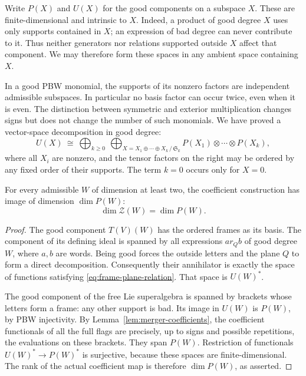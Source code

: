 Write $P(X)$ and $U(X)$ for the good components on a subspace $X$.
These are finite-dimensional and intrinsic to $X$.  Indeed, a product
of good degree $X$ uses only supports contained in $X$; an expression
of bad degree can never contribute to it.  Thus neither generators nor
relations supported outside $X$ affect that component.  We may
therefore form these spaces in any ambient space containing $X$.

In a good PBW monomial, the supports of its nonzero factors are
independent admissible subspaces.  In particular no basis factor can
occur twice, even when it is even.  The distinction between symmetric
and exterior multiplication changes signs but does not change the
number of such monomials.  We have proved a vector-space decomposition
in good degree:
\begin{equation}\label{eq:frame-pbw-decomposition}
 U(X)\ \cong\
 \bigoplus_{k\geq0}\ 
 \bigoplus_{X=X_1\oplus\cdots\oplus X_k\,/\,\mathfrak S_k}
 P(X_1)\otimes\cdots\otimes P(X_k),
\end{equation}
where all $X_i$ are nonzero, and the tensor factors on the right may
be ordered by any fixed order of their supports.  The term $k=0$
occurs only for $X=0$.

\begin{lemma}
\label{lem:frame-lie-identification}
For every admissible $W$ of dimension at least two, the coefficient
construction has image of dimension $\dim P(W)$:
\[
 \dim\mathcal Z(W)=\dim P(W).
\]
\end{lemma}

\begin{proof}
The good component $T(V)(W)$ has the ordered frames as its basis.
The component of its defining ideal is spanned by all expressions
$a r_Q b$ of good degree $W$, where $a,b$ are words.  Being good forces
the outside letters and the plane $Q$ to form a direct decomposition.
Consequently their annihilator is exactly the space of functions
satisfying \eqref{eq:frame-plane-relation}.  That space is $U(W)^*$.

The good component of the free Lie superalgebra is spanned by brackets
whose letters form a frame: any other support is bad.  Its image in
$U(W)$ is $P(W)$, by PBW injectivity.  By
Lemma~\ref{lem:merger-coefficients}, the coefficient functionals of all
the full flags are precisely, up to signs and possible repetitions,
the evaluations on these brackets.  They span $P(W)$.  Restriction of
functionals $U(W)^*\to P(W)^*$ is surjective, because these spaces are
finite-dimensional.  The rank of the actual coefficient map is
therefore $\dim P(W)$, as asserted.
\end{proof}

